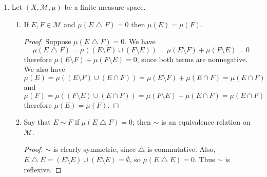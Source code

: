 \documentclass[10pt]{article}
\newcommand{\M}{\mathcal{M}}
\begin{document}
\begin{enumerate}
\renewcommand{\M}{\mathcal{M}}
\let\NN\undefined
\newcommand{\sd}{\bigtriangleup}

\item Let $(X,\M, \mu)$ be a finite measure space.
\begin{enumerate}
\item If $E,F \in \M$ and $\mu(E \sd F) = 0$ then $\mu(E) = \mu(F)$.

\begin{proof}

Suppose $\mu(E \sd F) = 0$.  We have
$$
\mu(E \sd F) = \mu((E \setminus F) \cup (F \setminus E)) = \mu(E \setminus F) + \mu(F \setminus E) = 0
$$
therefore $\mu(E \setminus F) + \mu(F \setminus E) = 0$, since both terms are nonnegative.  We also have
$$
\mu(E) = \mu((E \setminus F) \cup (E \cap F)) = \mu(E \setminus F) + \mu(E \cap F) = \mu(E \cap F)
$$
and
$$
\mu(F) = \mu((F \setminus E) \cup (E \cap F)) = \mu(F \setminus E) + \mu(E \cap F) = \mu(E \cap F)
$$
therefore $\mu(E) = \mu(F)$.
\begin{comment}
\begin{align*}
0 &= \mu(E \sd F) \\
&= \mu((E \setminus F) \cup (F \setminus E)) \\
&= \mu(E \setminus F) + \mu(F \setminus E) \\
&= |\mu(E \setminus F)| + |\mu(F \setminus E)| \\
&\geq |\mu (E \setminus F) - \mu(F \setminus E)| \\
&= |[\mu (E \setminus F) + \mu(E \cap F)] - [\mu(F \setminus E) + \mu(E \cap F)]| \\
&= |\mu ((E \setminus F) \cup (E \cap F)) - \mu((F \setminus E)\cup (E \cap F))| \\
&= |\mu(E) - \mu(F)|
\end{align*}
therefore $\mu(E) = \mu(F)$.
\end{comment}
\end{proof}

\item Say that $E \sim F$ if $\mu(E \sd F) = 0$; then $\sim$ is an equivalence relation on $\M$.

\begin{proof}
$\sim$ is clearly symmetric, since $\sd$ is commutative.  Also, $E \sd E = (E \setminus E) \cup (E \setminus E) = \emptyset$, so $\mu(E \sd E) = 0$.  Thus $\sim$ is reflexive.


\end{proof}
\end{enumerate}
\end{enumerate}
\end{document}
